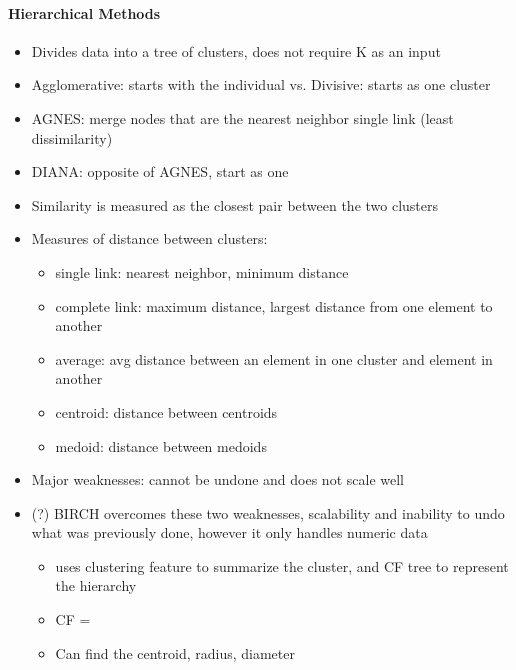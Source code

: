 \documentclass[11pt]{article}
\providecommand{\tightlist}{%
      \setlength{\itemsep}{0pt}\setlength{\parskip}{0pt}}
\begin{document}
    \paragraph{Hierarchical Methods}\label{hierarchical-methods}

    \begin{itemize}
\tightlist
\item
  Divides data into a tree of clusters, does not require K as an input
\item
  Agglomerative: starts with the individual vs. Divisive: starts as one
  cluster
\end{itemize}

    \begin{itemize}
\tightlist
\item
  AGNES: merge nodes that are the nearest neighbor single link (least
  dissimilarity)
\item
  DIANA: opposite of AGNES, start as one
\item
  Similarity is measured as the closest pair between the two clusters
\end{itemize}

    \begin{itemize}
\tightlist
\item
  Measures of distance between clusters:

  \begin{itemize}
  \tightlist
  \item
    single link: nearest neighbor, minimum distance
  \item
    complete link: maximum distance, largest distance from one element
    to another
  \item
    average: avg distance between an element in one cluster and element
    in another
  \item
    centroid: distance between centroids
  \item
    medoid: distance between medoids
  \end{itemize}
\item
  Major weaknesses: cannot be undone and does not scale well
\end{itemize}

    \begin{itemize}
\tightlist
\item
  (?) BIRCH overcomes these two weaknesses, scalability and inability to
  undo what was previously done, however it only handles numeric data

  \begin{itemize}
  \tightlist
  \item
    uses clustering feature to summarize the cluster, and CF tree to
    represent the hierarchy
  \item
    CF = 
  \item
    Can find the centroid, radius, diameter
  \end{itemize}
\end{itemize}
\end{document}
